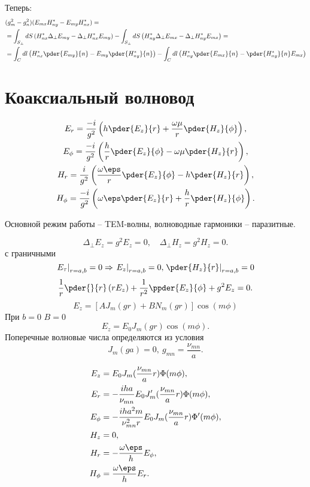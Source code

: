 Теперь:
\begin{align*}
	&(g_m^2 - g_n^2)(E_{mx}H_{ny}^* - E_{my}H_{nx}^*) =\\
	& = \int_{S_\perp} dS \left( H_{nx}^*\Delta_\perp E_{my} - \Delta_\perp H_{nx}^* E_{my} \right)
	-
	\int_{S_\perp} dS \left( H_{ny}^*\Delta_\perp E_{mx} - \Delta_\perp H_{ny}^* E_{mx} \right) =\\
	& = \int_C dl \left(H_{nx}^* \pder{E_{my}}{n} - E_{my}\pder{H_{ny}^*}{n}\right) -
	\int_C dl \left( H_{ny}^*\pder{E_{mx}}{n} - \pder{H_{ny}^*}{n} E_{mx} \right)
\end{align*}

\section{Коаксиальный волновод}
\begin{gather*}
	E_r =    \frac{-i}{g^2}\left(h\pder{E_z}{r} + \frac{\omega\mu}{r}\pder{H_z}{\phi}\right),\\
	E_\phi = \frac{-i}{g^2}\left(\frac{h}{r}\pder{E_z}{\phi} - \omega\mu\pder{H_z}{r}\right),\\
	H_r =    \frac{i}{g^2}\left(\frac{\omega\eps}{r}\pder{E_z}{\phi} - h\pder{H_z}{r}\right),\\
	H_\phi = \frac{-i}{g^2}\left(\omega\eps\pder{E_z}{r} + \frac{h}{r}\pder{H_z}{\phi}\right).
\end{gather*}

Основной режим работы -- TEM-волны, волноводные гармоники -- паразитные.

\[
	\Delta_\perp E_z = g^2 E_z = 0,\quad \Delta_\perp H_z = g^2 H_z = 0.
\]
с граничными
\[
	\left.E_\tau\right|_{r=a,b} = 0 \Rightarrow \left.E_z\right|_{r=a,b} = 0, \left.\pder{H_z}{r}\right|_{r=a,b} = 0
\]
\[
	\frac{1}{r}\pder{}{r}\left( rE_z \right) + \frac{1}{r^2}\ppder{E_z}{\phi} + g^2E_z = 0.
\]
\[
	E_z = [AJ_m(gr) + BN_m(gr)]\cos(m\phi)
\]
При \( b = 0 \) \( B = 0 \)
\[
	E_z = E_0J_m(gr)\cos(m\phi).
\]
Поперечные волновые числа определяются из условия
\[
	J_m(ga) = 0,\ g_{mn} = \frac{\nu_{mn}}{a}.
\]

\begin{align*}
	E_z &= E_0 J_m(\frac{\nu_{mn}}{a}r)\Phi(m\phi),\\
	E_r &= -\frac{iha}{\nu_{mn}}E_0 J_m'(\frac{\nu_{mn}}{a}r)\Phi(m\phi),\\
	E_\phi &= -\frac{iha^2m}{\nu_{mn}^2r}E_0 J_m(\frac{\nu_{mn}}{a}r)\Phi'(m\phi),\\
	H_z &= 0,\\
	H_r &= -\frac{\omega\eps}{h}E_\phi,\\
	H_\phi &= \frac{\omega\eps}{h}E_r.
\end{align*}


